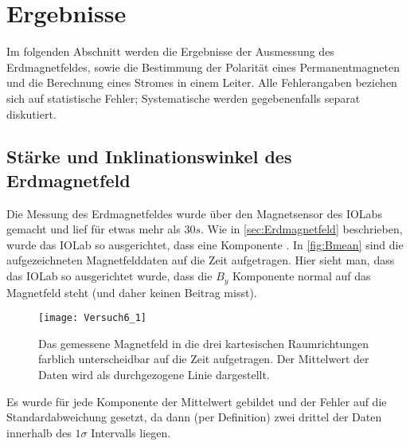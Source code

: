 \section{Ergebnisse}
\label{sec:ergebnisse}
Im folgenden Abschnitt werden die Ergebnisse der Ausmessung des Erdmagnetfeldes, sowie die Bestimmung der Polarität eines Permanentmagneten und die Berechnung eines Stromes in einem Leiter. Alle Fehlerangaben beziehen sich auf statistische Fehler; Systematische werden gegebenenfalls separat diskutiert.

\subsection{Stärke und Inklinationswinkel des Erdmagnetfeld}
Die Messung des Erdmagnetfeldes wurde über den Magnetsensor des IOLabs gemacht und lief für etwas mehr als \( 30 \unit{s} \). Wie in \autoref{sec:Erdmagnetfeld} beschrieben, wurde das IOLab so ausgerichtet, dass eine Komponente .
In \autoref{fig:Bmean} sind die aufgezeichneten Magnetfelddaten auf die Zeit aufgetragen. Hier sieht man, dass das IOLab so ausgerichtet wurde, dass die \( B_y \) Komponente normal auf das Magnetfeld steht (und daher keinen Beitrag misst). 

\begin{figure}[H]	
	\centering
	\texttt{[image: Versuch6\_1]}
	\caption{Das gemessene Magnetfeld in die drei kartesischen Raumrichtungen farblich unterscheidbar auf die Zeit aufgetragen. Der Mittelwert der Daten wird als durchgezogene Linie dargestellt.}
	\label{fig:Bmean}
\end{figure}

Es wurde für jede Komponente der Mittelwert gebildet und der Fehler auf die Standardabweichung gesetzt, da dann (per Definition) zwei drittel der Daten innerhalb des \( 1\sigma \) Intervalls liegen. 


